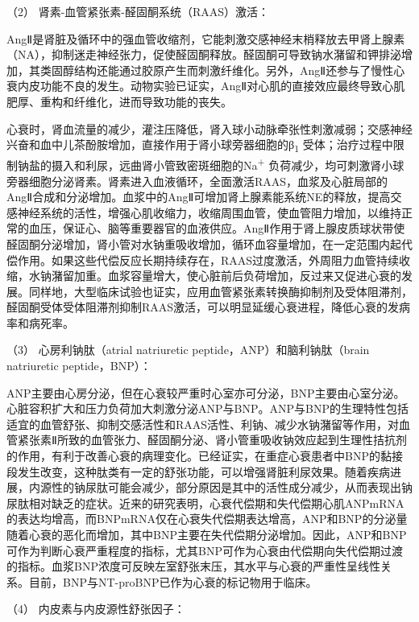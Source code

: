\hypertarget{text00072.htmlux5cux23CHP3-3-1-2-2-3-2}{}
（2） 肾素-血管紧张素-醛固酮系统（RAAS）激活：

AngⅡ是肾脏及循环中的强血管收缩剂，它能刺激交感神经末梢释放去甲肾上腺素（NA），抑制迷走神经张力，促使醛固酮释放。醛固酮可导致钠水潴留和钾排泌增加，其类固醇结构还能通过胶原产生而刺激纤维化。另外，AngⅡ还参与了慢性心衰内皮功能不良的发生。动物实验已证实，AngⅡ对心肌的直接效应最终导致心肌肥厚、重构和纤维化，进而导致功能的丧失。

心衰时，肾血流量的减少，灌注压降低，肾入球小动脉牵张性刺激减弱；交感神经兴奋和血中儿茶酚胺增加，直接作用于肾小球旁器细胞的β\textsubscript{1}
受体；治疗过程中限制钠盐的摄入和利尿，远曲肾小管致密斑细胞的Na\textsuperscript{+}
负荷减少，均可刺激肾小球旁器细胞分泌肾素。肾素进入血液循环，全面激活RAAS，血浆及心脏局部的AngⅡ合成和分泌增加。血浆中的AngⅡ可增加肾上腺素能系统NE的释放，提高交感神经系统的活性，增强心肌收缩力，收缩周围血管，使血管阻力增加，以维持正常的血压，保证心、脑等重要器官的血液供应。AngⅡ作用于肾上腺皮质球状带使醛固酮分泌增加，肾小管对水钠重吸收增加，循环血容量增加，在一定范围内起代偿作用。如果这些代偿反应长期持续存在，RAAS过度激活，外周阻力血管持续收缩，水钠潴留加重。血浆容量增大，使心脏前后负荷增加，反过来又促进心衰的发展。同样地，大型临床试验也证实，应用血管紧张素转换酶抑制剂及受体阻滞剂，醛固酮受体受体阻滞剂抑制RAAS激活，可以明显延缓心衰进程，降低心衰的发病率和病死率。

\hypertarget{text00072.htmlux5cux23CHP3-3-1-2-2-3-3}{}
（3） 心房利钠肽（atrial natriuretic peptide，ANP）和脑利钠肽（brain
natriuretic peptide，BNP）：

ANP主要由心房分泌，但在心衰较严重时心室亦可分泌，BNP主要由心室分泌。心脏容积扩大和压力负荷加大刺激分泌ANP与BNP。ANP与BNP的生理特性包括适宜的血管舒张、抑制交感活性和RAAS活性、利钠、减少水钠潴留等作用，对血管紧张素Ⅱ所致的血管张力、醛固酮分泌、肾小管重吸收钠效应起到生理性拮抗剂的作用，有利于改善心衰的病理变化。已经证实，在重症心衰患者中BNP的黏接段发生改变，这种肽类有一定的舒张功能，可以增强肾脏利尿效果。随着疾病进展，内源性的钠尿肽可能会减少，部分原因是其中的活性成分减少，从而表现出钠尿肽相对缺乏的症状。近来的研究表明，心衰代偿期和失代偿期心肌ANPmRNA的表达均增高，而BNPmRNA仅在心衰失代偿期表达增高，ANP和BNP的分泌量随着心衰的恶化而增加，其中BNP主要在失代偿期分泌增加。因此，ANP和BNP可作为判断心衰严重程度的指标，尤其BNP可作为心衰由代偿期向失代偿期过渡的指标。血浆BNP浓度可反映左室舒张末压，其水平与心衰的严重性呈线性关系。目前，BNP与NT-proBNP已作为心衰的标记物用于临床。

\hypertarget{text00072.htmlux5cux23CHP3-3-1-2-2-3-4}{}
（4） 内皮素与内皮源性舒张因子：

